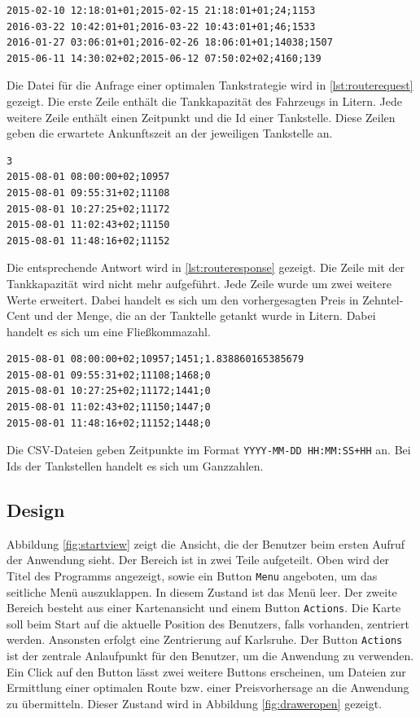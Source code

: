 \documentclass[
ngerman          %
,a4paper          %
,11pt
,pdftex
]{report}
\begin{document}
\begin{lstlisting}[caption={CSV einer Preisantwort}, label={lst:priceresponse}]
2015-02-10 12:18:01+01;2015-02-15 21:18:01+01;24;1153
2016-03-22 10:42:01+01;2016-03-22 10:43:01+01;46;1533
2016-01-27 03:06:01+01;2016-02-26 18:06:01+01;14038;1507
2015-06-11 14:30:02+02;2015-06-12 07:50:02+02;4160;139
\end{lstlisting}

Die Datei für die Anfrage einer optimalen Tankstrategie wird in \ref{lst:routerequest} gezeigt. Die erste Zeile enthält die Tankkapazität des Fahrzeugs in Litern. Jede weitere Zeile enthält einen Zeitpunkt und die Id einer Tankstelle. Diese Zeilen geben die erwartete Ankunftszeit an der jeweiligen Tankstelle an.

\begin{lstlisting}[caption={CSV einer Routenanfrage}, label={lst:routerequest}]
3
2015-08-01 08:00:00+02;10957
2015-08-01 09:55:31+02;11108
2015-08-01 10:27:25+02;11172
2015-08-01 11:02:43+02;11150
2015-08-01 11:48:16+02;11152
\end{lstlisting}

Die entsprechende Antwort wird in \ref{lst:routeresponse} gezeigt. Die Zeile mit der Tankkapazität wird nicht mehr aufgeführt. Jede Zeile wurde um zwei weitere Werte erweitert. Dabei handelt es sich um den vorhergesagten Preis in Zehntel-Cent und der Menge, die an der Tanktelle getankt wurde in Litern. Dabei handelt es sich um eine Fließkommazahl.

\begin{lstlisting}[caption={CSV einer Routenantwort}, label={lst:routeresponse}]
2015-08-01 08:00:00+02;10957;1451;1.838860165385679
2015-08-01 09:55:31+02;11108;1468;0
2015-08-01 10:27:25+02;11172;1441;0
2015-08-01 11:02:43+02;11150;1447;0
2015-08-01 11:48:16+02;11152;1448;0
\end{lstlisting}

Die \ac{CSV}-Dateien geben Zeitpunkte im Format \texttt{YYYY-MM-DD HH:MM:SS+HH} an. Bei Ids der Tankstellen handelt es sich um Ganzzahlen.


\subsection{Design}

Abbildung \ref{fig:startview} zeigt die Ansicht, die der Benutzer beim ersten Aufruf der Anwendung sieht. Der Bereich ist in zwei Teile aufgeteilt. Oben wird der Titel des Programms angezeigt, sowie ein Button \texttt{Menu} angeboten, um das seitliche Menü auszuklappen. In diesem Zustand ist das Menü leer. Der zweite Bereich besteht aus einer Kartenansicht und einem Button \texttt{Actions}. Die Karte soll beim Start auf die aktuelle Position des Benutzers, falls vorhanden, zentriert werden. Ansonsten erfolgt eine Zentrierung auf Karlsruhe. Der Button \texttt{Actions} ist der zentrale Anlaufpunkt für den Benutzer, um die Anwendung zu verwenden. Ein Click auf den Button lässt zwei weitere Buttons erscheinen, um Dateien zur Ermittlung einer optimalen Route bzw. einer Preisvorhersage an die Anwendung zu übermitteln. Dieser Zustand wird in Abbildung \ref{fig:draweropen} gezeigt.
\end{document}
